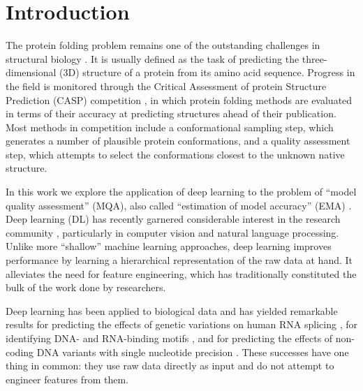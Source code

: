 \documentclass{bioinfo}
\begin{document}
\maketitle

\section{Introduction}

The protein folding problem remains one of the outstanding challenges
in structural biology \citep{dill2012folding}.  It is usually defined
as the task of predicting the three-dimensional (3D) structure of a
protein from its amino acid sequence.
Progress in the field is monitored through the Critical Assessment of
protein Structure Prediction (CASP) competition \citep{moult1995large},
in which protein folding methods are evaluated in terms of their
accuracy at predicting structures ahead of their
publication. Most methods in competition include a conformational
sampling step, which generates a number of plausible protein
conformations, and a quality assessment step, which attempts to select
the conformations closest to the unknown native structure.

In this work we explore the application of deep learning to the
problem of ``model quality assessment'' (MQA), also called
``estimation of model accuracy'' (EMA) \citep{kryshtafovych2015}. Deep
learning (DL) has recently garnered considerable interest in the
research community \citep{lecun2015deep}, particularly in computer
vision and natural language processing. Unlike more ``shallow''
machine learning approaches, deep learning improves performance by
learning a hierarchical representation of the raw data at hand. It
alleviates the need for feature engineering, which has traditionally
constituted the bulk of the work done by researchers.

Deep learning has been applied to biological data and has
yielded remarkable results for predicting the effects of genetic
variations on human RNA splicing \citep{xiong2015human}, for
identifying DNA- and RNA-binding
motifs \citep{alipanahi2015predicting}, and for predicting the effects
of non-coding DNA variants with single nucleotide
precision \citep{zhou2015predicting}. These successes have one thing in
common: they use raw data directly as input and do not attempt to
engineer features from them.
\end{document}

